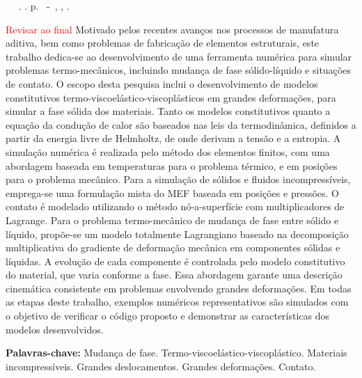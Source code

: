\documentclass[Tese.tex]{subfiles}
\begin{document}
	\setlength{\absparsep}{18pt} %
	\begin{resumo}
		\begin{flushleft} 
			\setlength{\absparsep}{0pt} %
			\SingleSpacing 
			\imprimirautorabr~ ~\textbf{\imprimirtitulo}.	\imprimirdata. \pageref{LastPage}p. 
			\imprimirtipotrabalho~-~\imprimirinstituicao, \imprimirlocal, \imprimirdata. 
		\end{flushleft}
		\OnehalfSpacing 	
		\textcolor{red}{Revisar ao final}
		Motivado pelos recentes avanços nos processos de manufatura aditiva, bem como problemas de fabricação de elementos estruturais, este trabalho dedica-se ao desenvolvimento de uma ferramenta numérica para simular problemas termo-mecânicos, incluindo mudança de fase sólido-líquido e situações de contato. O escopo desta pesquisa inclui o desenvolvimento de modelos constitutivos termo-viscoelástico-viscoplásticos em grandes deformações, para simular a fase sólida dos materiais. Tanto os modelos constitutivos quanto a equação da condução de calor são baseados nas leis da termodinâmica, definidos a partir da energia livre de Helmholtz, de onde derivam a tensão e a entropia. A simulação numérica é realizada pelo método dos elementos finitos, com uma abordagem baseada em temperaturas para o problema térmico, e em posições para o problema mecânico. Para a simulação de sólidos e fluidos incompressíveis, emprega-se uma formulação mista do MEF baseada em posições e pressões. O contato é modelado utilizando o método nó-a-superfície com multiplicadores de Lagrange. Para o problema termo-mecânico de mudança de fase entre sólido e líquido, propõe-se um modelo totalmente Lagrangiano baseado na decomposição multiplicativa do gradiente de deformação mecânica em componentes sólidas e líquidas. A evolução de cada componente é controlada pelo modelo constitutivo do material, que varia conforme a fase. Essa abordagem garante uma descrição cinemática consistente em problemas envolvendo grandes deformações. Em todas as etapas deste trabalho, exemplos numéricos representativos são simulados com o objetivo de verificar o código proposto e demonstrar as características dos modelos desenvolvidos.
				
		\textbf{Palavras-chave:} Mudança de fase. Termo-viscoelástico-viscoplástico. Materiais incompressíveis. Grandes deslocamentos. Grandes deformações. Contato.
	\end{resumo}
\end{document}
